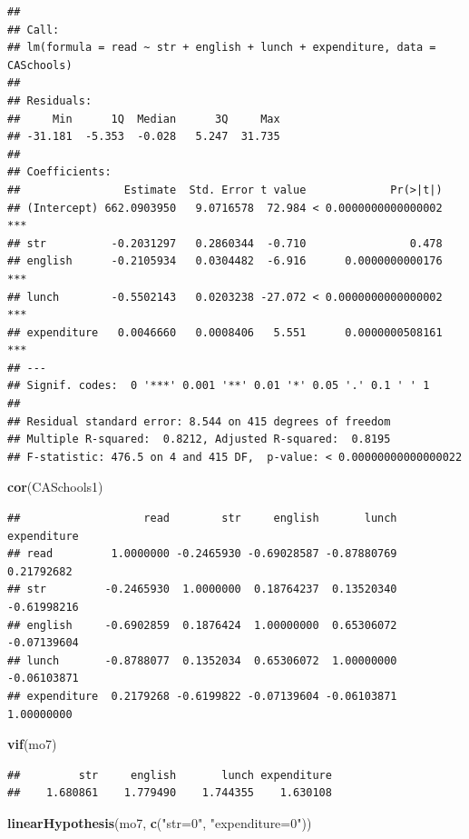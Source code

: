 \documentclass[
]{book}
\newenvironment{Shaded}{\begin{snugshade}}{\end{snugshade}}
\newcommand{\KeywordTok}[1]{\textcolor[rgb]{0.13,0.29,0.53}{\textbf{#1}}}
\newcommand{\NormalTok}[1]{#1}
\newcommand{\StringTok}[1]{\textcolor[rgb]{0.31,0.60,0.02}{#1}}
\begin{document}
\begin{verbatim}
## 
## Call:
## lm(formula = read ~ str + english + lunch + expenditure, data = CASchools)
## 
## Residuals:
##     Min      1Q  Median      3Q     Max 
## -31.181  -5.353  -0.028   5.247  31.735 
## 
## Coefficients:
##                Estimate  Std. Error t value             Pr(>|t|)    
## (Intercept) 662.0903950   9.0716578  72.984 < 0.0000000000000002 ***
## str          -0.2031297   0.2860344  -0.710                0.478    
## english      -0.2105934   0.0304482  -6.916      0.0000000000176 ***
## lunch        -0.5502143   0.0203238 -27.072 < 0.0000000000000002 ***
## expenditure   0.0046660   0.0008406   5.551      0.0000000508161 ***
## ---
## Signif. codes:  0 '***' 0.001 '**' 0.01 '*' 0.05 '.' 0.1 ' ' 1
## 
## Residual standard error: 8.544 on 415 degrees of freedom
## Multiple R-squared:  0.8212, Adjusted R-squared:  0.8195 
## F-statistic: 476.5 on 4 and 415 DF,  p-value: < 0.00000000000000022
\end{verbatim}

\begin{Shaded}
\begin{Highlighting}[]
\KeywordTok{cor}\NormalTok{(CASchools1)}
\end{Highlighting}
\end{Shaded}

\begin{verbatim}
##                   read        str     english       lunch expenditure
## read         1.0000000 -0.2465930 -0.69028587 -0.87880769  0.21792682
## str         -0.2465930  1.0000000  0.18764237  0.13520340 -0.61998216
## english     -0.6902859  0.1876424  1.00000000  0.65306072 -0.07139604
## lunch       -0.8788077  0.1352034  0.65306072  1.00000000 -0.06103871
## expenditure  0.2179268 -0.6199822 -0.07139604 -0.06103871  1.00000000
\end{verbatim}

\begin{Shaded}
\begin{Highlighting}[]
\KeywordTok{vif}\NormalTok{(mo7)}
\end{Highlighting}
\end{Shaded}

\begin{verbatim}
##         str     english       lunch expenditure 
##    1.680861    1.779490    1.744355    1.630108
\end{verbatim}

\begin{Shaded}
\begin{Highlighting}[]
\KeywordTok{linearHypothesis}\NormalTok{(mo7, }\KeywordTok{c}\NormalTok{(}\StringTok{"str=0"}\NormalTok{, }\StringTok{"expenditure=0"}\NormalTok{))}
\end{Highlighting}
\end{Shaded}
\end{document}
